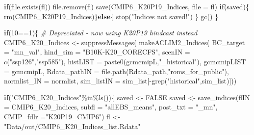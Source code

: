 \documentclass[
]{article}
\newenvironment{Shaded}{\begin{snugshade}}{\end{snugshade}}
\newcommand{\AttributeTok}[1]{\textcolor[rgb]{0.77,0.63,0.00}{#1}}
\newcommand{\CommentTok}[1]{\textcolor[rgb]{0.56,0.35,0.01}{\textit{#1}}}
\newcommand{\ConstantTok}[1]{\textcolor[rgb]{0.00,0.00,0.00}{#1}}
\newcommand{\ControlFlowTok}[1]{\textcolor[rgb]{0.13,0.29,0.53}{\textbf{#1}}}
\newcommand{\DecValTok}[1]{\textcolor[rgb]{0.00,0.00,0.81}{#1}}
\newcommand{\FunctionTok}[1]{\textcolor[rgb]{0.00,0.00,0.00}{#1}}
\newcommand{\NormalTok}[1]{#1}
\newcommand{\OtherTok}[1]{\textcolor[rgb]{0.56,0.35,0.01}{#1}}
\newcommand{\SpecialCharTok}[1]{\textcolor[rgb]{0.00,0.00,0.00}{#1}}
\newcommand{\StringTok}[1]{\textcolor[rgb]{0.31,0.60,0.02}{#1}}
\begin{document}
\begin{Shaded}
\begin{Highlighting}[]
      \ControlFlowTok{if}\NormalTok{(}\FunctionTok{file.exists}\NormalTok{(fl)) }\FunctionTok{file.remove}\NormalTok{(fl)}
      \FunctionTok{save}\NormalTok{(CMIP6\_K20P19\_Indices, }\AttributeTok{file =}\NormalTok{ fl)}
       \ControlFlowTok{if}\NormalTok{(saved)\{}
        \FunctionTok{rm}\NormalTok{(CMIP6\_K20P19\_Indices)\}}\ControlFlowTok{else}\NormalTok{\{}
          \FunctionTok{stop}\NormalTok{(}\StringTok{"Indices not saved!"}\NormalTok{)}
\NormalTok{        \}}
      \FunctionTok{gc}\NormalTok{()}
\NormalTok{     \}}
     
     
    \ControlFlowTok{if}\NormalTok{(}\DecValTok{10}\SpecialCharTok{==}\DecValTok{1}\NormalTok{)\{}
      \CommentTok{\# Depreciated {-} now using K20P19 hindcast instead}
\NormalTok{     CMIP6\_K20\_Indices }\OtherTok{\textless{}{-}} \FunctionTok{suppressMessages}\NormalTok{(}
                        \FunctionTok{makeACLIM2\_Indices}\NormalTok{(}
                        \AttributeTok{BC\_target =} \StringTok{"mn\_val"}\NormalTok{,}
                        \AttributeTok{hind\_sim  =}  \StringTok{"B10K{-}K20\_CORECFS"}\NormalTok{,}
                        \AttributeTok{scenIN    =} \FunctionTok{c}\NormalTok{(}\StringTok{"ssp126"}\NormalTok{,}\StringTok{"ssp585"}\NormalTok{),}
                        \AttributeTok{histLIST  =} \FunctionTok{paste0}\NormalTok{(gcmcmipL,}\StringTok{"\_historical"}\NormalTok{),}
                        \AttributeTok{gcmcmipLIST =}\NormalTok{ gcmcmipL,}
                        \AttributeTok{Rdata\_pathIN =} \FunctionTok{file.path}\NormalTok{(Rdata\_path,}\StringTok{"roms\_for\_public"}\NormalTok{),}
                        \AttributeTok{normlist\_IN =}\NormalTok{ normlist,}
                        \AttributeTok{sim\_listIN =}\NormalTok{ sim\_list[}\SpecialCharTok{{-}}\FunctionTok{grep}\NormalTok{(}\StringTok{"historical"}\NormalTok{,sim\_list)]))}
    
     \ControlFlowTok{if}\NormalTok{(}\StringTok{"CMIP6\_K20\_Indices"}\SpecialCharTok{\%in\%}\FunctionTok{ls}\NormalTok{())\{  }
\NormalTok{      saved }\OtherTok{\textless{}{-}} \ConstantTok{FALSE}
\NormalTok{      saved }\OtherTok{\textless{}{-}} \FunctionTok{save\_indices}\NormalTok{(}\AttributeTok{flIN =}\NormalTok{ CMIP6\_K20\_Indices, }
                   \AttributeTok{subfl =} \StringTok{"allEBS\_means"}\NormalTok{,}
                   \AttributeTok{post\_txt =} \StringTok{"\_mn"}\NormalTok{,}
                   \AttributeTok{CMIP\_fdlr =}\StringTok{"K20P19\_CMIP6"}\NormalTok{)}
\NormalTok{      fl }\OtherTok{\textless{}{-}} \StringTok{"Data/out/CMIP6\_K20\_Indices\_list.Rdata"}
      

\end{Highlighting}
\end{Shaded}
\end{document}
